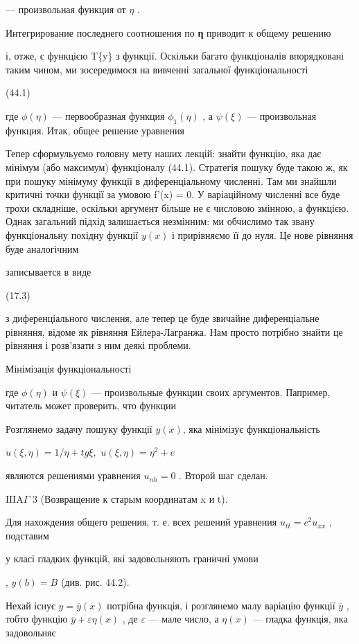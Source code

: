 \documentclass[
  ukrainian,
]{article}
\begin{document}
--- произвольная функция от \(\eta\) .

Интегрирование последнего соотношения по \textbf{η} приводит к общему
решению

і, отже, є функцією T\{y\} з функції. Оскільки багато функціоналів
впорядковані таким чином, ми зосередимося на вивченні загальної
функціональності

(44.1)

где \(\phi(\eta)\) --- первообразная функция \(\phi_1(\eta)\) , а
\(\psi(\xi)\) --- произвольная функция. Итак, общее решение уравнения

Тепер сформульуємо головну мету наших лекцій: знайти функцію, яка дає
мінімум (або максимум) функціоналу (44.1). Стратегія пошуку буде такою
ж, як при пошуку мінімуму функції в диференціальному численні. Там ми
знайшли критичні точки функції за умовою f'(x) = 0. У варіаційному
численні все буде трохи складніше, оскільки аргумент більше не є
числовою змінною, а функцією. Однак загальний підхід залишається
незмінним: ми обчислимо так звану функціональну похідну функції \(y(x)\)
і прирівняємо її до нуля. Це нове рівняння буде аналогічним

записывается в виде

(17.3)

з диференціального числення, але тепер це буде звичайне диференціальне
рівняння, відоме як рівняння Ейлера-Лагранжа. Нам просто потрібно знайти
це рівняння і розв'язати з ним деякі проблеми.

Мінімізація функціональності

где \(\phi(\eta)\) и \(\psi(\xi)\) --- произвольные функции своих
аргументов. Папример, читатель может проверить, что функции

Розглянемо задачу пошуку функції \(y(x)\), яка мінімізує
функціональність

\(u(\xi, \eta) = 1/\eta + tg \xi,\) \(u(\xi, \eta) = \eta^2 + e\)

являются решениями уравнения \(u_{\mathrm{ }nh}=0\) . Второй шаг сделан.

\(\text{IIIA}\Gamma\) 3 (Возвращение к старым координатам x и t).

Для нахождения общего решения, т. е. всех решений уравнения
\(u_{tt} = c^2 u_{xx}\) , подставим

у класі гладких функцій, які задовольняють граничні умови

, \(y(b) = B\) (див. рис. 44.2).

Нехай існує \(y = \overline{y}(x)\) потрібна функція, і розглянемо малу
варіацію функції \(\overline{y}\) , тобто функцію
\(\overline{y} + \varepsilon \eta(x)\) , де \(\varepsilon\) --- мале
число, а \(\eta(x)\) --- гладка функція, яка задовольняє
\end{document}

